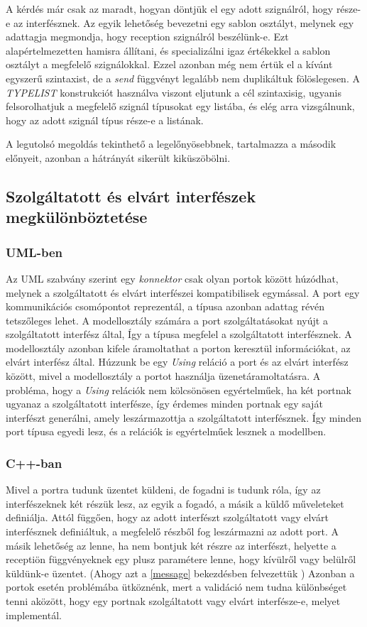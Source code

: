 \documentclass[a4paper,12pt]{report}
\begin{document}
\begin{enumerate}
A kérdés már csak az maradt, hogyan döntjük el egy adott szignálról, hogy része-e az interfésznek. Az egyik lehetőség bevezetni egy sablon osztályt, melynek egy adattagja megmondja, hogy reception szignálról beszélünk-e. Ezt alapértelmezetten hamisra állítani, és specializálni igaz értékekkel a sablon osztályt a megfelelő szignálokkal. Ezzel azonban még nem értük el a kívánt egyszerű szintaxist, de a \textit{send} függvényt legalább nem duplikáltuk fölöslegesen. A \textit{TYPELIST} \cite{typelist} konstrukciót használva viszont eljutunk a cél szintaxisig, ugyanis felsorolhatjuk a megfelelő szignál típusokat egy listába, és elég arra vizsgálnunk, hogy az adott szignál típus része-e a listának.
\end{enumerate}

A legutolsó megoldás tekinthető a legelőnyösebbnek, tartalmazza a második előnyeit, azonban a hátrányát sikerült kiküszöbölni.

\subsection{Szolgáltatott és elvárt interfészek megkülönböztetése}
\subsubsection{UML-ben}
Az UML szabvány szerint egy \textit{konnektor} csak olyan portok között
húzódhat, melynek a szolgáltatott és elvárt interfészei kompatibilisek egymással.
A port egy kommunikációs csomópontot reprezentál, a típusa azonban adattag révén tetszőleges lehet.
A modellosztály számára a port szolgáltatásokat nyújt a szolgáltatott interfész által, Így a típusa megfelel a szolgáltatott interfésznek.
A modellosztály azonban kifele áramoltathat a porton keresztül információkat, az elvárt interfész által.
Húzzunk be egy \textit{Using} reláció a port és az elvárt interfész között, mivel a modellosztály a portot használja üzenetáramoltatásra.
A probléma, hogy a \textit{Using} relációk nem kölcsönösen egyértelműek, ha két portnak ugyanaz a szolgáltatott interfésze, így
érdemes minden portnak egy saját interfészt generálni, amely leszármazottja a szolgáltatott interfésznek. Így minden port típusa egyedi lesz, és a relációk is egyértelműek lesznek a modellben.
\subsubsection{C++-ban}
Mivel a portra tudunk üzentet küldeni, de fogadni is tudunk róla, így az interfészeknek két részük lesz, az egyik a fogadó, a másik a küldő műveleteket definiálja. Attól függően, hogy az adott interfészt szolgáltatott vagy elvárt interfésznek definiáltuk, a megfelelő részből fog leszármazni az adott port. A másik lehetőség az lenne, ha nem bontjuk két részre az interfészt, helyette a receptiön függvényeknek egy plusz paramétere lenne, hogy kívülről vagy belülről küldünk-e üzentet. (Ahogy azt a \ref{message} bekezdésben felvezettük ) Azonban a portok esetén problémába ütköznénk, mert a validáció nem tudna különbséget tenni aközött, hogy egy portnak szolgáltatott vagy elvárt interfésze-e, melyet implementál. \\
\end{document}
